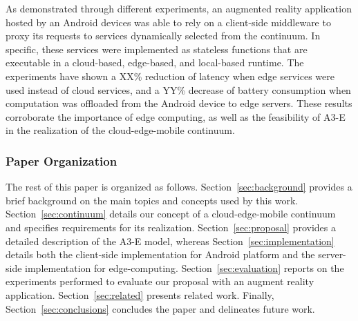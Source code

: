 

As demonstrated through different experiments, an augmented reality application hosted by an Android devices was able to rely on a client-side middleware to proxy its requests to services dynamically selected from the continuum. In specific, these services were implemented as stateless functions that are executable in a cloud-based, edge-based, and local-based runtime. The experiments have shown a XX\% reduction of latency when edge services were used instead of cloud services, and a YY\% decrease of battery consumption when computation was offloaded from the Android device to edge servers. These results corroborate the importance of edge computing, as well as the feasibility of A3-E in the realization of the cloud-edge-mobile continuum.




\subsubsection*{Paper Organization}

The rest of this paper is organized as follows. 
Section~\ref{sec:background} provides a brief background on the main topics and concepts used by this work. Section~\ref{sec:continuum} details our concept of a cloud-edge-mobile continuum and specifies requirements for its realization. Section~\ref{sec:proposal} provides a detailed description of the A3-E model, whereas Section~\ref{sec:implementation} details both the client-side implementation for Android platform and the server-side implementation for edge-computing. Section~\ref{sec:evaluation} reports on the experiments performed to evaluate our proposal with an augment reality application. Section~\ref{sec:related} presents related work. Finally, Section~\ref{sec:conclusions} concludes the paper and delineates future work.





